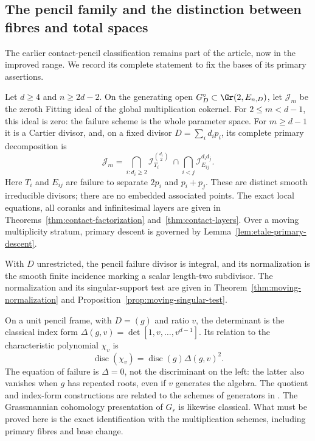 \subsection*{The pencil family and the distinction between fibres and total spaces}
The earlier contact-pencil classification remains part of the article,
now in the improved range. We record its complete statement to fix
the bases of its primary assertions.

\begin{theorem}\label{thm:contact-main}
Let $d\ge4$ and $n\ge2d-2$. On the generating open
$G_D^\circ\subset\Gr(2,E_{n,D})$, let $\mathcal J_m$ be the
zeroth Fitting ideal of the global multiplication cokernel.
For $2\le m<d-1$, this ideal is zero: the failure scheme is the
whole parameter space. For $m\ge d-1$ it is a Cartier divisor,
and, on a fixed divisor $D=\sum_i d_i p_i$, its complete primary
decomposition is
\begin{equation}\label{eq:intro-contact-primary}
 \mathcal J_m=
 \bigcap_{i:d_i\ge2}\mathcal I_{T_i}^{\binom{d_i}{2}}
 \ \cap\!\bigcap_{i<j}\mathcal I_{E_{ij}}^{d_i d_j}.
\end{equation}
Here $T_i$ and $E_{ij}$ are failure to separate $2p_i$ and
$p_i+p_j$. These are distinct smooth irreducible divisors; there
are no embedded associated points. The exact local equations,
all coranks and infinitesimal layers are given in
Theorems~\ref{thm:contact-factorization} and~\ref{thm:contact-layers}.
Over a moving multiplicity stratum, primary descent is governed by
Lemma~\ref{lem:etale-primary-descent}.

With $D$ unrestricted, the pencil failure divisor is integral, and
its normalization is the smooth finite incidence marking a scalar
length-two subdivisor. The normalization and its singular-support
test are given in Theorem~\ref{thm:moving-normalization} and
Proposition~\ref{prop:moving-singular-test}.
\end{theorem}

On a unit pencil frame, with $D=(g)$ and ratio $v$, the determinant
is the classical index form
$\Delta(g,v)=\det[1,v,\ldots,v^{d-1}]$. Its relation to the
characteristic polynomial $\chi_v$ is
\[
 \operatorname{disc}(\chi_v)=\operatorname{disc}(g)\Delta(g,v)^2.
\]
The equation of failure is $\Delta=0$, not the discriminant on the
left: the latter also vanishes when $g$ has repeated roots, even if
$v$ generates the algebra. The quotient and index-form constructions
are related to the schemes of generators in \cite{ABHS}. The
Grassmannian cohomology presentation of $G_r$ is likewise classical.
What must be proved here is the exact identification with the
multiplication schemes, including primary fibres and base change.

